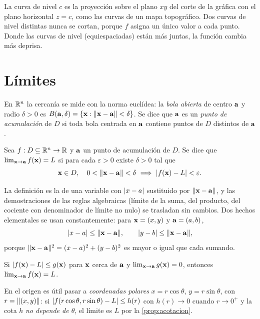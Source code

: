La curva de nivel $c$ es la proyección sobre el plano $xy$ del corte de la gráfica con el plano horizontal $z=c$, como las curvas de un mapa topográfico. Dos curvas de nivel distintas nunca se cortan, porque $f$ asigna un único valor a cada punto. Donde las curvas de nivel (equiespaciadas) están más juntas, la función cambia más deprisa.

\addtocounter{figure}{1}%

\addtocounter{definicion}{1}%

\section{Límites}

En $\mathbb{R}^n$ la cercanía se mide con la norma euclídea: la \emph{bola abierta} de centro $\mathbf{a}$ y radio $\delta>0$ es $B(\mathbf{a},\delta)=\{\mathbf{x}:\lVert\mathbf{x}-\mathbf{a}\rVert<\delta\}$. Se dice que $\mathbf{a}$ es un \emph{punto de acumulación} de $D$ si toda bola centrada en $\mathbf{a}$ contiene puntos de $D$ distintos de $\mathbf{a}$.

\begin{definicion}[Límite]\label{def:limite-n}
Sea $f:D\subseteq\mathbb{R}^n\to\mathbb{R}$ y $\mathbf{a}$ un punto de acumulación de $D$. Se dice que $\lim_{\mathbf{x}\to\mathbf{a}}f(\mathbf{x})=L$ si para cada $\varepsilon>0$ existe $\delta>0$ tal que
\[
\vx\in D,\quad 0<\norm{\vx-\va}<\delta\ \Longrightarrow\ \abs{f(\vx)-L}<\varepsilon .
\]
\end{definicion}

La definición es la de una variable con $\lvert x-a\rvert$ sustituido por $\lVert\mathbf{x}-\mathbf{a}\rVert$, y las demostraciones de las reglas algebraicas (límite de la suma, del producto, del cociente con denominador de límite no nulo) se trasladan sin cambios. Dos hechos elementales se usan constantemente: para $\mathbf{x}=(x,y)$ y $\mathbf{a}=(a,b)$,
\begin{equation}\label{eq:t3-coordenada}
\lvert x-a\rvert\le\lVert\mathbf{x}-\mathbf{a}\rVert,\qquad \lvert y-b\rvert\le\lVert\mathbf{x}-\mathbf{a}\rVert,
\end{equation}
porque $\lVert\mathbf{x}-\mathbf{a}\rVert^2=(x-a)^2+(y-b)^2$ es mayor o igual que cada sumando.

\begin{proposicion}[Acotación]\label{prop:acotacion}
Si $\lvert f(\mathbf{x})-L\rvert\le g(\mathbf{x})$ para $\mathbf{x}$ cerca de $\mathbf{a}$ y $\lim_{\mathbf{x}\to\mathbf{a}}g(\mathbf{x})=0$, entonces $\lim_{\mathbf{x}\to\mathbf{a}}f(\mathbf{x})=L$.
\end{proposicion}

En el origen es útil pasar a \emph{coordenadas polares} $x=r\cos\theta$, $y=r\sin\theta$, con $r=\lVert(x,y)\rVert$: si $\lvert f(r\cos\theta,r\sin\theta)-L\rvert\le h(r)$ con $h(r)\to0$ cuando $r\to0^+$ y la cota $h$ \emph{no depende de $\theta$}, el límite es $L$ por la \cref{prop:acotacion}.

